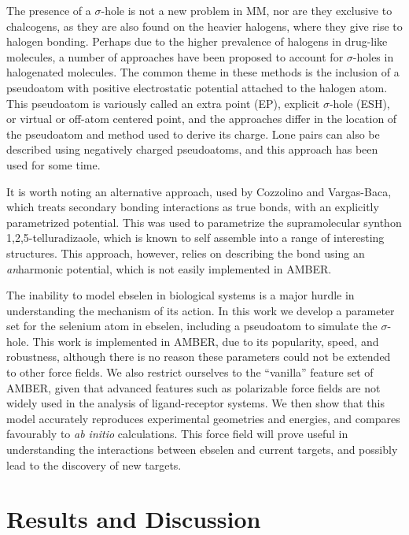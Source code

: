 \begin{refsection}
The presence of a $\sigma$-hole is not a new problem in MM, nor are they exclusive to chalcogens, as they are also found on the heavier halogens, where they give rise to halogen bonding.\autocite{Clark2007}
Perhaps due to the higher prevalence of halogens in drug-like molecules, a number of approaches have been proposed to account for $\sigma$-holes in halogenated molecules.
The common theme in these methods is the inclusion of a pseudoatom with positive electrostatic potential attached to the halogen atom.
This pseudoatom is variously called an extra point (EP), explicit $\sigma$-hole (ESH), or virtual or off-atom centered point, and the approaches differ in the location of the pseudoatom and method used to derive its charge.\autocite{Renidine2011,Ibrahim2011,Hobza2012,Harder2016}
Lone pairs can also be described using negatively charged pseudoatoms, and this approach has been used for some time.\autocite{Dixon1997,Cieplak2001,Harder2016}

It is worth noting an alternative approach, used by Cozzolino and Vargas-Baca, which treats secondary bonding interactions as true bonds, with an explicitly parametrized potential.\autocite{Cozzolino2011}
This was used to parametrize the supramolecular synthon 1,2,5-tellura\-dizaole, which is known to self assemble into a range of interesting structures.
This approach, however, relies on describing the bond using an \emph{an}harmonic potential, which is not easily implemented in AMBER.

The inability to model ebselen in biological systems is a major hurdle in understanding the mechanism of its action.
In this work we develop a parameter set for the selenium atom in ebselen, including a pseudoatom to simulate the $\sigma$-hole.
This work is implemented in AMBER, due to its popularity, speed, and robustness, although there is no reason these parameters could not be extended to other force fields.
We also restrict ourselves to the ``vanilla'' feature set of AMBER, given that advanced features such as polarizable force fields are not widely used in the analysis of ligand-receptor systems.
We then show that this model accurately reproduces experimental geometries and energies, and compares favourably to \emph{ab initio} calculations.
This force field will prove useful in understanding the interactions between ebselen and current targets, and possibly lead to the discovery of new targets.

\section{Results and Discussion}


\end{refsection}
